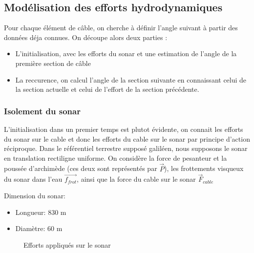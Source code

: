 \documentclass[12pt,a4paper]{report}
\begin{document}
\subsection{Modélisation des efforts hydrodynamiques}

Pour chaque élément de câble, on cherche à définir l'angle suivant à partir des données déja connues.
On découpe alors deux parties :
\begin{itemize}
    \item L'initialisation, avec les efforts du sonar et une estimation de l'angle de la première section de câble
    \item La reccurence, on calcul l'angle de la section suivante en connaissant celui de la section actuelle et celui
    de l'effort de la section précédente.
\end{itemize}

\subsubsection*{Isolement du sonar}


L'initialisation dans un premier temps est plutot évidente, on connait les efforts du sonar sur le cable et donc les
efforts du cable sur le sonar par principe d'action réciproque.
Dans le référentiel terrestre supposé galiléen, nous supposons le sonar en translation rectiligne uniforme.
On considère la force de pesanteur et la poussée d'archimède (ces deux sont représentés par ${\vec{P}}$),
les frottements visqueux du sonar dans l'eau $\vec{f_{frot}}$, ainsi que la force du cable sur le sonar $\vec{F}_{cable}$

Dimension du sonar:
\begin{itemize}
    \item Longueur: 830 m
    \item Diamètre: 60 m
\end{itemize}

\begin{figure}[H]
\centering
{}
\caption{Efforts appliqués sur le sonar}
\end{figure}
\end{document}
